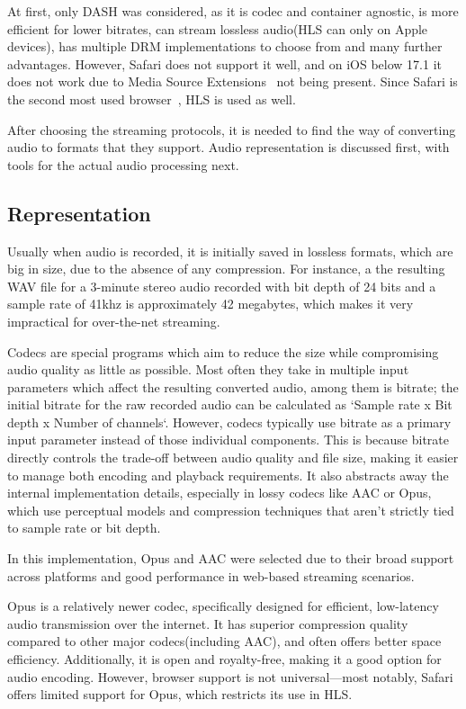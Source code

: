 At first, only DASH was considered, as it is codec and container agnostic,
is more efficient for lower bitrates, can stream lossless audio(HLS can only on Apple devices),
has multiple DRM implementations to choose from and many further advantages.
However, Safari does not support it well, and on iOS below 17.1 it does not work due to
Media Source Extensions~\cite{mse,msecaniuse} not being present.
Since Safari is the second most used browser~\cite{browserusage}, HLS is used as well.

After choosing the streaming protocols, it is needed to find the way of converting audio to formats that
they support. Audio representation is discussed first, with tools for the actual audio processing next.

\subsection{Representation}
Usually when audio is recorded, it is initially saved in lossless formats, which are big in size, due to
the absence of any compression. For instance, a the resulting WAV file for a 3-minute stereo audio
recorded with bit depth of 24 bits and a sample rate of 41khz is approximately 42 megabytes, which makes
it very impractical for over-the-net streaming.

Codecs are special programs which aim to reduce the size
while compromising audio quality as little as possible. Most often they take in multiple input parameters
which affect the resulting converted audio, among them is bitrate; the initial bitrate for the raw recorded audio
can be calculated as `Sample rate x Bit depth x Number of channels`.
However, codecs typically use bitrate as a primary input parameter instead of those individual components.
This is because bitrate directly controls the trade-off between audio quality and file size,
making it easier to manage both encoding and playback requirements.
It also abstracts away the internal implementation details, especially in lossy codecs like AAC or Opus,
which use perceptual models and compression techniques that aren’t strictly tied to sample rate or bit depth.

In this implementation, Opus and AAC were selected due to their broad support across platforms and
good performance in web-based streaming scenarios.

Opus is a relatively newer codec, specifically designed for efficient, low-latency audio transmission over the internet.
It has superior compression quality compared to other major codecs(including AAC)\cite{opusefficiency},
and often offers better space efficiency.
Additionally, it is open and royalty-free, making it a good option for audio encoding.
However, browser support is not universal—most notably, Safari offers limited support for Opus\cite{caniuseopus},
which restricts its use in HLS.

